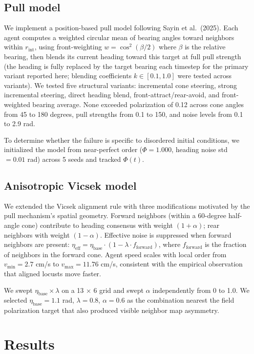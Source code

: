 \documentclass[11pt]{article}
\begin{document}
\subsection{Pull model}
We implement a position-based pull model following Sayin et al.\ (2025). Each agent computes a weighted circular mean of bearing angles toward neighbors within $r_{\mathrm{int}}$, using front-weighting $w = \cos^2(\beta/2)$ where $\beta$ is the relative bearing, then blends its current heading toward this target at full pull strength (the heading is fully replaced by the target bearing each timestep for the primary variant reported here; blending coefficients $k \in [0.1, 1.0]$ were tested across variants). We tested five structural variants: incremental cone steering, strong incremental steering, direct heading blend, front-attract/rear-avoid, and front-weighted bearing average. None exceeded polarization of 0.12 across cone angles from 45 to 180 degrees, pull strengths from 0.1 to 150, and noise levels from 0.1 to 2.9 rad.

To determine whether the failure is specific to disordered initial conditions, we initialized the model from near-perfect order ($\Phi = 1.000$, heading noise std $= 0.01$ rad) across 5 seeds and tracked $\Phi(t)$.

\subsection{Anisotropic Vicsek model}
We extended the Vicsek alignment rule with three modifications motivated by the pull mechanism's spatial geometry. Forward neighbors (within a 60-degree half-angle cone) contribute to heading consensus with weight $(1 + \alpha)$; rear neighbors with weight $(1 - \alpha)$. Effective noise is suppressed when forward neighbors are present: $\eta_{\mathrm{eff}} = \eta_{\mathrm{base}} \cdot (1 - \lambda \cdot f_{\mathrm{forward}})$, where $f_{\mathrm{forward}}$ is the fraction of neighbors in the forward cone. Agent speed scales with local order from $v_{\min} = 2.7$ cm/s to $v_{\max} = 11.76$ cm/s, consistent with the empirical observation that aligned locusts move faster.

We swept $\eta_{\mathrm{base}} \times \lambda$ on a 13 $\times$ 6 grid and swept $\alpha$ independently from 0 to 1.0. We selected $\eta_{\mathrm{base}} = 1.1$ rad, $\lambda = 0.8$, $\alpha = 0.6$ as the combination nearest the field polarization target that also produced visible neighbor map asymmetry.

\section{Results}
\end{document}
